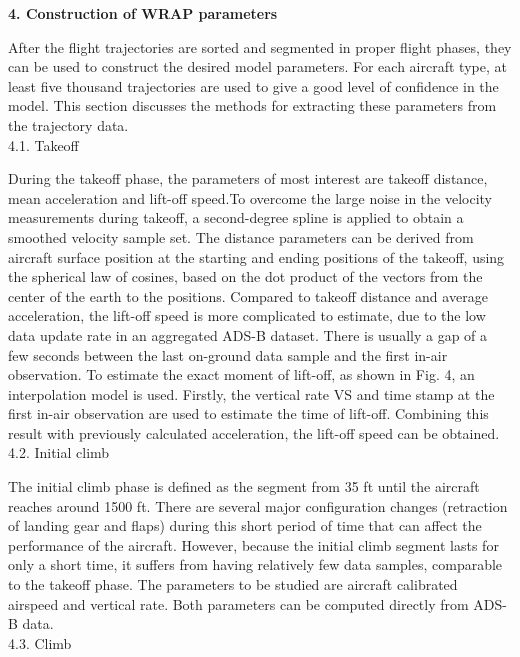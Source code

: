 \documentclass[a4paper,punct,space,heading=true,AutoFakeBold]{ctexrep}
\begin{document}
{
	\noindent\bfseries{4. Construction of WRAP parameters}
}

After the flight trajectories are sorted and segmented in proper flight phases, they can be used to construct the desired model parameters. For each aircraft type, at least five thousand trajectories are used to give a good level of confidence in the model. This section discusses the methods for extracting these parameters from the trajectory data.\\
4.1. Takeoff

During the takeoff phase, the parameters of most interest are takeoff distance, mean acceleration and lift-off speed.To overcome the large noise in the velocity measurements during takeoff, a second-degree spline is applied to obtain a smoothed velocity sample set. The distance parameters can be derived from aircraft surface position at the starting and ending positions of the takeoff, using the spherical law of cosines, based on the dot product of the vectors from the center of the earth to the positions.
Compared to takeoff distance and average acceleration, the lift-off speed is more complicated to estimate, due to the low data update rate in an aggregated ADS-B dataset. There is usually a gap of a few seconds between the last on-ground data sample and the first in-air observation.
To estimate the exact moment of lift-off, as shown in Fig. 4, an interpolation model is used. Firstly, the vertical rate VS and time stamp at the first in-air observation are used to estimate the time of lift-off. Combining this result with previously calculated acceleration, the lift-off speed can be obtained.\\
4.2. Initial climb

The initial climb phase is defined as the segment from 35 ft until the aircraft reaches around 1500 ft. There are several major configuration changes (retraction of landing gear and flaps) during this short period of time that can affect the performance of the aircraft. However, because the initial climb segment lasts for only a short time, it suffers from having relatively few data samples, comparable to the takeoff phase. The parameters to be studied are aircraft calibrated airspeed and vertical rate. Both parameters can be computed directly from ADS-B data.\\
4.3. Climb
\end{document}
